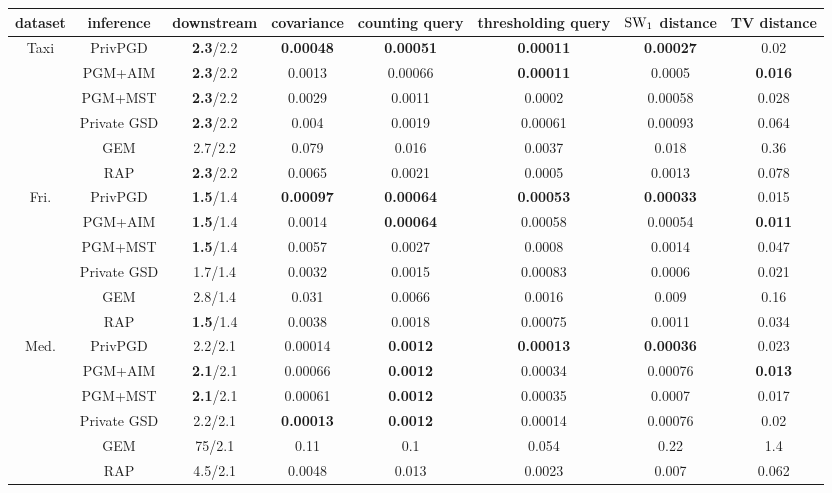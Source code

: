  \begin{table}[ht]
 \footnotesize
\centering
\begin{tabular}{cccccccc}
\toprule
dataset & inference & downstream & covariance & counting query & thresholding query & $\text{SW}_1$ distance & TV distance \\
\midrule \multirow{6}{*}{Taxi } & PrivPGD&\textbf{2.3}/2.2 & \textbf{0.00048} & \textbf{0.00051} & \textbf{0.00011} & \textbf{0.00027} & 0.02 \\
 & PGM+AIM&\textbf{2.3}/2.2 & 0.0013 & 0.00066 & \textbf{0.00011} & 0.0005 & \textbf{0.016} \\
 & PGM+MST&\textbf{2.3}/2.2 & 0.0029 & 0.0011 & 0.0002 & 0.00058 & 0.028 \\
 & Private GSD&\textbf{2.3}/2.2 & 0.004 & 0.0019 & 0.00061 & 0.00093 & 0.064 \\
 & GEM&2.7/2.2 & 0.079 & 0.016 & 0.0037 & 0.018 & 0.36 \\
 & RAP&\textbf{2.3}/2.2 & 0.0065 & 0.0021 & 0.0005 & 0.0013 & 0.078 \\
\midrule \multirow{6}{*}{Fri. } & PrivPGD&\textbf{1.5}/1.4 & \textbf{0.00097} & \textbf{0.00064} & \textbf{0.00053} & \textbf{0.00033} & 0.015 \\
 & PGM+AIM&\textbf{1.5}/1.4 & 0.0014 & \textbf{0.00064} & 0.00058 & 0.00054 & \textbf{0.011} \\
 & PGM+MST&\textbf{1.5}/1.4 & 0.0057 & 0.0027 & 0.0008 & 0.0014 & 0.047 \\
 & Private GSD&1.7/1.4 & 0.0032 & 0.0015 & 0.00083 & 0.0006 & 0.021 \\
 & GEM&2.8/1.4 & 0.031 & 0.0066 & 0.0016 & 0.009 & 0.16 \\
 & RAP&\textbf{1.5}/1.4 & 0.0038 & 0.0018 & 0.00075 & 0.0011 & 0.034 \\
\midrule \multirow{6}{*}{Med. } & PrivPGD&2.2/2.1 & 0.00014 & \textbf{0.0012} & \textbf{0.00013} & \textbf{0.00036} & 0.023 \\
 & PGM+AIM&\textbf{2.1}/2.1 & 0.00066 & \textbf{0.0012} & 0.00034 & 0.00076 & \textbf{0.013} \\
 & PGM+MST&\textbf{2.1}/2.1 & 0.00061 & \textbf{0.0012} & 0.00035 & 0.0007 & 0.017 \\
 & Private GSD&2.2/2.1 & \textbf{0.00013} & \textbf{0.0012} & 0.00014 & 0.00076 & 0.02 \\
 & GEM&75/2.1 & 0.11 & 0.1 & 0.054 & 0.22 & 1.4 \\
 & RAP&4.5/2.1 & 0.0048 & 0.013 & 0.0023 & 0.007 & 0.062 \\
 \midrule

\end{tabular}
\end{table}
